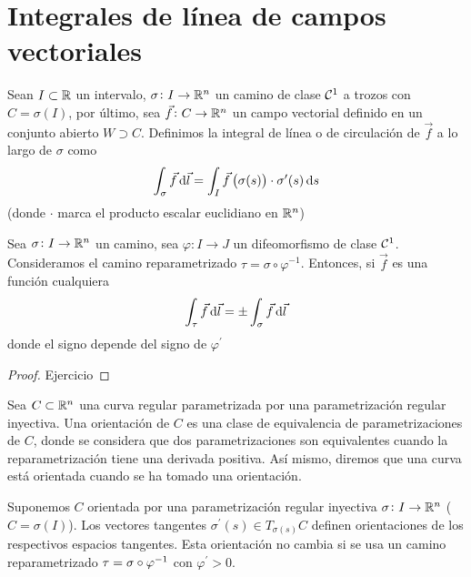 \section{Integrales de línea de campos vectoriales}

\begin{defi}
    Sean $I \subset \mathbb{R}$ un intervalo, $\sigma \colon I \to \mathbb{R}^n$ un camino de clase $\mathcal{C}^1$ a trozos con $C = \sigma(I)$, por último,
    sea $\vec{f} \colon C \to \mathbb{R}^n$ un campo vectorial definido en un conjunto abierto $W \supset C$. Definimos la integral de línea o de circulación
    de $\vec{f}$ a lo largo de $\sigma$ como
    \[
        \int_\sigma \vec{f} \dif \vec{l} = \int_I \vec{f} \left( \sigma(s) \right) \cdot \sigma^\prime(s) \dif s
    \]
    (donde $\cdot$ marca el producto escalar euclidiano en $\mathbb{R}^n$)
\end{defi}

\begin{prop}
    Sea $\sigma  \colon I \to \mathbb{R}^n$ un camino, sea $\varphi \colon I \to J$ un difeomorfismo de clase $\mathcal{C}^1$. Consideramos
    el camino reparametrizado $\tau = \sigma \circ \varphi^{-1}$. Entonces, si $\vec{f}$ es una función cualquiera
    \[
        \int_\tau \vec{f} \dif \vec{l} = \pm \int_\sigma \vec{f} \dif \vec{l}
    \]
    donde el signo depende del signo de $\varphi^\prime$
\end{prop}

\begin{proof}
    Ejercicio
\end{proof}

\begin{defi}
    Sea $C \subset \mathbb{R}^n$ una curva regular parametrizada por una parametrización regular inyectiva. Una orientación de $C$ es una clase
    de equivalencia de parametrizaciones de $C$, donde se considera que dos parametrizaciones son equivalentes cuando la reparametrización
    tiene una derivada positiva. Así mismo, diremos que una curva está orientada cuando se ha tomado una orientación.
\end{defi}

\begin{obs}
    Suponemos $C$ orientada por una parametrización regular inyectiva $\sigma \colon I \to \mathbb{R}^n$ ($C = \sigma(I)$). Los vectores tangentes
    $\sigma^\prime(s) \in T_{\sigma(s)}C$ definen orientaciones de los respectivos espacios tangentes. Esta orientación no cambia si se usa
    un camino reparametrizado $\tau = \sigma \circ \varphi^{-1}$ con $\varphi^\prime > 0$.
\end{obs}

